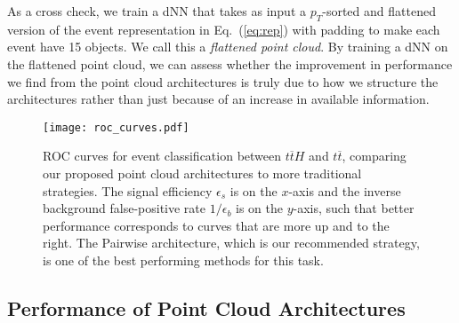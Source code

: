 \documentclass[aps,prd,twocolumn,superscriptaddress,floatfix,longbibliography,preprintnumbers,nofootinbib]{revtex4-1} %
\DeclareRobustCommand{\Eq}[1]{Eq.~(\ref{eq:#1})}
\begin{document}
As a cross check, we train a dNN that takes as input a $p_T$-sorted and flattened version of the event representation in \Eq{rep} with padding to make each event have 15 objects.
%
We call this a \textit{flattened point cloud}. 
%
By training a dNN on the flattened point cloud, we can assess whether the improvement in performance we find from the point cloud architectures is truly due to how we structure the architectures rather than just because of an increase in available information.



\begin{figure}[t]
 \begin{center}
   \texttt{[image: roc\_curves.pdf]} 
 \end{center} 
 \caption{
   ROC curves for event classification between $t\overline{t}H$ and $t\overline{t}$, comparing our proposed point cloud architectures to more traditional strategies.
 The signal efficiency $\epsilon_s$ is on the $x$-axis and the inverse background false-positive rate $1 / \epsilon_b$ is on the $y$-axis, such that better performance corresponds to curves that are more up and to the right.
 The Pairwise architecture, which is our recommended strategy, is one of the best performing methods for this task.
 }
 \label{fig:ROCs}
\end{figure}


\subsection{Performance of Point Cloud Architectures}
\label{sec:results}
\end{document}
